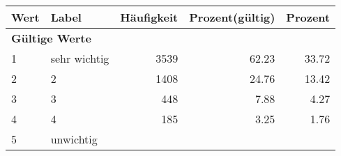      \begin{longtable}{lXrrr}
     \toprule
     \textbf{Wert} & \textbf{Label} & \textbf{Häufigkeit} & \textbf{Prozent(gültig)} & \textbf{Prozent} \\
     \endhead
     \midrule
     \multicolumn{5}{l}{\textbf{Gültige Werte}}\\

     1 &
     \multicolumn{1}{X}{ sehr wichtig   } &


       \num{3539} &
       \num[round-mode=places,round-precision=2]{62.23} &
         \num[round-mode=places,round-precision=2]{33.72} \\

     2 &
     \multicolumn{1}{X}{ 2   } &


       \num{1408} &
       \num[round-mode=places,round-precision=2]{24.76} &
         \num[round-mode=places,round-precision=2]{13.42} \\

     3 &
     \multicolumn{1}{X}{ 3   } &


       \num{448} &
       \num[round-mode=places,round-precision=2]{7.88} &
         \num[round-mode=places,round-precision=2]{4.27} \\

     4 &
     \multicolumn{1}{X}{ 4   } &


       \num{185} &
       \num[round-mode=places,round-precision=2]{3.25} &
         \num[round-mode=places,round-precision=2]{1.76} \\

     5 &
     \multicolumn{1}{X}{ unwichtig   } &



\end{longtable}
